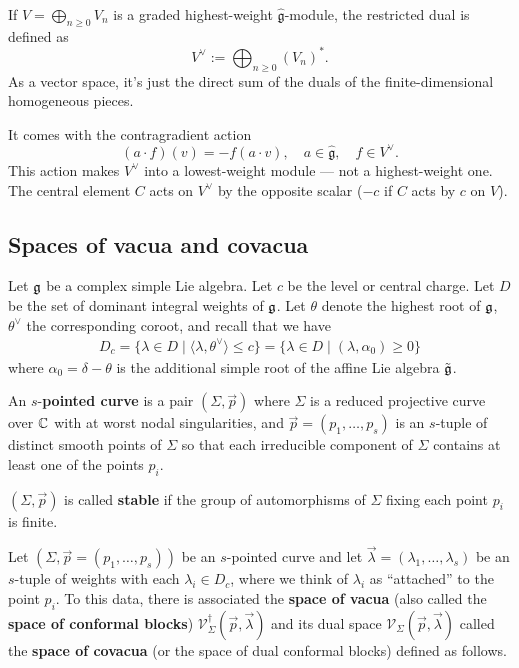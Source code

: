 \documentclass[12pt]{article}
\begin{document}
\begin{definition}
    If $V=\bigoplus_{n\geq 0} V_n$ is a graded highest-weight $\widehat{\mathfrak{g}}$-module, the restricted dual is defined as
    \[
    V^\vee := \bigoplus_{n\geq 0} (V_n)^*.
    \]
    As a vector space, it's just the direct sum of the duals of the finite-dimensional homogeneous pieces.

    It comes with the contragradient action
    \[
    (a\cdot f)(v) = -f(a\cdot v), \quad a\in\widehat{\mathfrak{g}}, \quad f\in V^\vee.
    \]
    This action makes $V^\vee$ into a lowest-weight module — not a highest-weight one. The central element $C$ acts on $V^\vee$ by the opposite scalar ($-c$ if $C$ acts by $c$ on $V$).
\end{definition}


\subsection{Spaces of vacua and covacua}
Let $\mathfrak{g}$ be a complex simple Lie algebra. Let $c$ be the level or central charge. Let $D$ be the set of dominant integral weights of $\mathfrak{g}$. Let $\theta$ denote the highest root of $\mathfrak{g}$, $\theta^\vee$ the corresponding coroot, and recall that we have \begin{align*}
    D_c = \{\lambda \in D \mid \langle \lambda, \theta^\vee \rangle \leq c\} = \{\lambda \in D \mid (\lambda, \alpha_0) \geq 0\}
\end{align*} where $\alpha_0 = \delta - \theta$ is the additional simple root of the affine Lie algebra $\tilde{\mathfrak{g}}$.

\begin{definition}
    An $s$-\textbf{pointed curve} is a pair $(\Sigma, \vec{p})$ where $\Sigma$ is a reduced projective curve over $\mathbb{C}$ with at worst nodal singularities, and $\vec{p} = (p_1, \ldots, p_s)$ is an $s$-tuple of distinct smooth points of $\Sigma$ so that each irreducible component of $\Sigma$ contains at least one of the points $p_i$.

    $(\Sigma, \vec{p})$ is called \textbf{stable} if the group of automorphisms of $\Sigma$ fixing each point $p_i$ is finite.
\end{definition}

Let $(\Sigma, \vec{p} = (p_1, \ldots, p_s))$ be an $s$-pointed curve and let $\vec{\lambda} = (\lambda_1, \ldots, \lambda_s)$
be an $s$-tuple of weights with each $\lambda_i \in D_c$, where we think of $\lambda_i$ as “attached” to the point $p_i$.
To this data, there is associated the \textbf{space of vacua} (also called the \textbf{space of conformal blocks})
$\mathcal{V}^{\dagger}_{\Sigma}(\vec{p}, \vec{\lambda})$
and its dual space $\mathcal{V}_{\Sigma}(\vec{p}, \vec{\lambda})$
called the \textbf{space of covacua} (or the space of dual conformal blocks) defined as follows.
\end{document}
